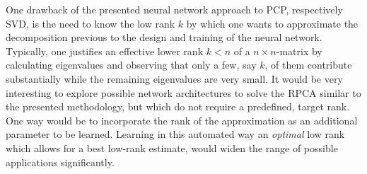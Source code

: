 One drawback of the presented neural network approach to PCP, respectively SVD, is the need to know the low rank $k$ by which one wants to approximate the decomposition previous to the design and training of the neural network. Typically, one justifies an effective lower rank $k<n$ of a $n\times n$-matrix by calculating eigenvalues and observing that only a few, say $k$, of them contribute substantially while the remaining eigenvalues are very small. It would be very interesting to explore possible network architectures to solve the RPCA similar to the presented methodology, but which do not require a predefined, target rank. One way would be to incorporate the rank of the approximation as an additional parameter to be learned. Learning in this automated way an \textit{optimal} low rank which allows for a best low-rank estimate, would widen the range of possible applications significantly.

